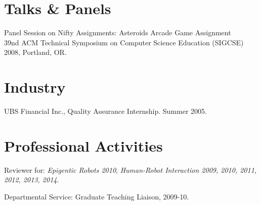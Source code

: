 \documentclass[10pt,letterpaper]{article}
\renewenvironment{itemize}{
  \begin{list}{}{
    \setlength{\leftmargin}{1.5em}
    \setlength{\itemsep}{0.25em}
    \setlength{\parskip}{0pt}
    \setlength{\parsep}{0.25em}
  }
}{
  \end{list}
}
\begin{document}
\section*{Talks \& Panels}
\begin{itemize}
	\item Panel Session on Nifty Assignments: Asteroids Arcade Game Assignment \\
	39nd ACM Technical Symposium on Computer Science Education (SIGCSE) 2008, Portland, OR.
\end{itemize}

\section*{Industry}
\begin{itemize}
	\item UBS Financial Inc., Quality Assurance Internship. Summer 2005.
\end{itemize}

\section*{Professional Activities}

\begin{itemize}
\item Reviewer for:
  \textit{Epigentic Robots 2010},
  \textit{Human-Robot Interaction 2009, 2010, 2011, 2012, 2013, 2014}.
\item Departmental Service: Graduate Teaching Liaison, 2009-10.
\end{itemize}
\end{document}

